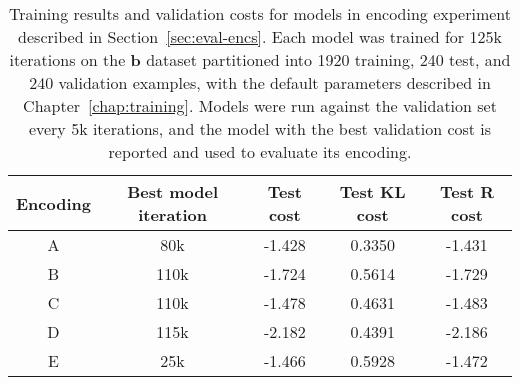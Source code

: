 \begin{table}[h]
\centering
    \caption[Training results for models in encoding experiment]{Training results  and validation costs for models in encoding experiment described in Section~\ref{sec:eval-encs}.
    Each model was trained for 125k iterations on the \textbf{b} dataset partitioned into 1920 training, 240 test, and 240 validation examples, with the default parameters described in Chapter~\ref{chap:training}.
    Models were run against the validation set every 5k iterations, and the model with the best validation cost is reported and used to evaluate its encoding.
    \label{apptbl:train-encs}}
\begin{tabular}{c c c c c}
\toprule
    Encoding & Best model iteration & Test cost & Test KL cost & Test R cost \\ \midrule
    A & 80k & -1.428 & 0.3350 & -1.431 \\
    B & 110k & -1.724 & 0.5614 & -1.729 \\
    C & 110k & -1.478 & 0.4631 & -1.483 \\
    D & 115k & -2.182 & 0.4391 & -2.186 \\
    E & 25k & -1.466 & 0.5928 &  -1.472
\end{tabular}
\end{table}


